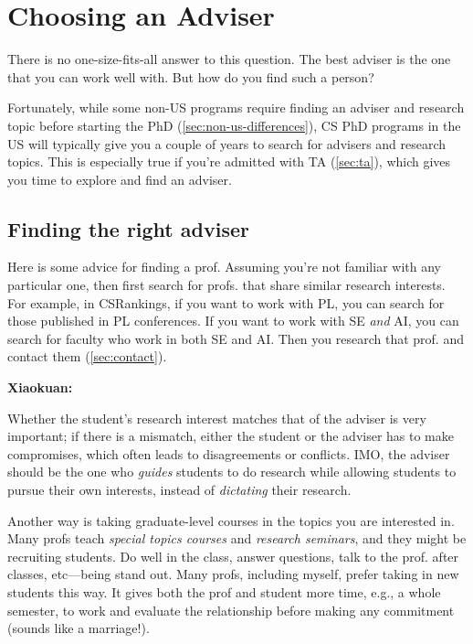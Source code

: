 \documentclass[oneside,11pt,dvipsnames]{book}
\newenvironment{commentbox}[1][]{
  \small
  \begin{mybox}
    {\small \textbf{#1}}
  }{
  \end{mybox}
}
\begin{document}
\section{Choosing an Adviser}
There is no one-size-fits-all answer to this question. The best adviser is the one that you can work well with.  But how do you find such a person?

Fortunately, while some non-US programs require finding an adviser and research topic before starting the PhD (\autoref{sec:non-us-differences}), CS PhD programs in the US will typically give you a couple of years to search for advisers and research topics.  This is especially true if you're admitted with TA (\autoref{sec:ta}), which gives you time to explore and find an adviser.

\subsection{Finding the right adviser}

Here is some advice for finding a prof.  Assuming you're not familiar with any particular one, then first search for profs. that share similar research interests.  For example, in CSRankings, if you want to work with PL, you can search for those published in PL conferences.  If you want to work with SE \emph{and} AI, you can search for faculty who work in both SE and AI.  Then you research that prof. and contact them (\autoref{sec:contact}).

\begin{commentbox}[Xiaokuan:]
  Whether the student's research interest matches that of the adviser is very important;
  if there is a mismatch,
  either the student or the adviser has to make compromises,
  which often leads to disagreements or conflicts.
  IMO, the adviser should be the one who \emph{guides}  students to do research while allowing students to pursue their own interests,
  instead of \emph{dictating} their research.
\end{commentbox}


Another way is taking graduate-level courses in the topics you are interested in.  Many profs teach \emph{special topics courses} and \emph{research seminars}, and they might be recruiting students. Do well in the class, answer questions, talk to the prof. after classes, etc---being stand out.  Many profs, including myself, prefer taking in new students this way.  It gives both the prof and student more time, e.g., a whole semester, to work and evaluate the relationship before making any commitment (sounds like a marriage!).
\end{document}
